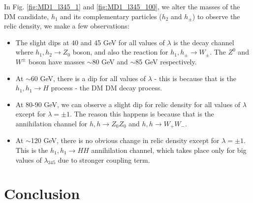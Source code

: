 \documentclass[12pt]{article}
\begin{document}
In Fig. \ref{fig:MD1_l345_1} and \ref{fig:MD1_l345_100}, we alter the masses of the DM candidate, $h_1$ and its complementary particles ($h_2$ and $h_{\pm}$) to observe the relic density, we make a few observations:
\begin{itemize}
    \item The slight dips at 40 and 45 GeV for all values of $\lambda$ is the decay channel where $h_1, h_2 \rightarrow Z_0$ boson, and also the reaction for $h_1, h_{\pm} \rightarrow W_\pm$. The $Z^0$ and $W^\pm$ boson have masses $\sim$80 GeV and $\sim$85 GeV respectively.
    \item At $\sim$60 GeV, there is a dip for all values of $\lambda$ - this is because that is the $h_1,h_1\rightarrow H$ process - the DM DM decay process. 
    \item At 80-90 GeV, we can observe a slight dip for relic density for all values of $\lambda$ except for $\lambda = \pm1$. The reason this happens is because that is the annihilation channel for $h, h \rightarrow Z_0Z_0$ and $h, h \rightarrow W_+ W_-$.
    \item At $\sim$120 GeV, there is no obvious change in relic density except for $\lambda = \pm1$. This is the $h_1,h_1\rightarrow H H$ annihilation channel, which takes place only for big values of $\lambda_{345}$ due to stronger coupling term.
\end{itemize}

\section{Conclusion}
\label{sec:conclusion}

\onecolumn
\newpage



\newpage
\onecolumn
\appendix
\end{document}
